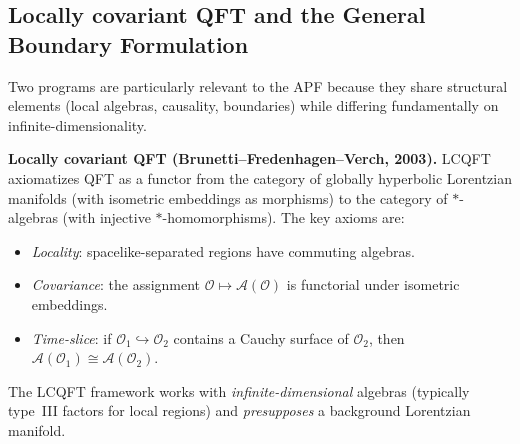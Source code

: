 \documentclass[11pt,a4paper]{article}
\theoremstyle{definition}
\begin{document}
\subsection{Locally covariant QFT and the General Boundary Formulation}
\label{sec:lcqft_oeckl}

Two programs are particularly relevant to the APF because they
share structural elements (local algebras, causality, boundaries)
while differing fundamentally on infinite-dimensionality.

\smallskip\noindent\textbf{Locally covariant QFT
(Brunetti--Fredenhagen--Verch, 2003).}\quad
LCQFT axiomatizes QFT as a functor from the category of globally
hyperbolic Lorentzian manifolds (with isometric embeddings as morphisms)
to the category of $*$-algebras (with injective $*$-homomorphisms).
The key axioms are:
\begin{itemize}[nosep]
  \item \textit{Locality}: spacelike-separated regions have commuting
  algebras.
  \item \textit{Covariance}: the assignment $\mathcal{O} \mapsto
  \mathcal{A}(\mathcal{O})$ is functorial under isometric embeddings.
  \item \textit{Time-slice}: if $\mathcal{O}_1 \hookrightarrow
  \mathcal{O}_2$ contains a Cauchy surface of $\mathcal{O}_2$, then
  $\mathcal{A}(\mathcal{O}_1) \cong \mathcal{A}(\mathcal{O}_2)$.
\end{itemize}
The LCQFT framework works with \emph{infinite-dimensional} algebras
(typically type~III factors for local regions) and
\emph{presupposes} a background Lorentzian manifold.
\end{document}
